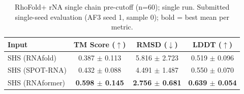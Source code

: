 \begin{table}[htbp]
\centering
\caption{RhoFold+ rNA single chain pre-cutoff (n=60); single run. Submitted single-seed evaluation (AF3 seed 1, sample 0); bold = best mean per metric.}
\label{tab:rf_rna_single_chain_pre_cutoff}
\begin{tabular}{lccc}
\toprule
Input & TM Score ($\uparrow$) & RMSD ($\downarrow$) & LDDT ($\uparrow$) \\
\midrule
SHS (RNAfold) & 0.387 $\pm$ 0.113 & 5.816 $\pm$ 2.723 & 0.519 $\pm$ 0.096 \\
SHS (SPOT-RNA) & 0.432 $\pm$ 0.088 & 4.491 $\pm$ 1.487 & 0.550 $\pm$ 0.070 \\
SHS (RNAformer) & \textbf{0.598 $\pm$ 0.145} & \textbf{2.756 $\pm$ 0.681} & \textbf{0.639 $\pm$ 0.054} \\
\bottomrule
\end{tabular}
\end{table}
